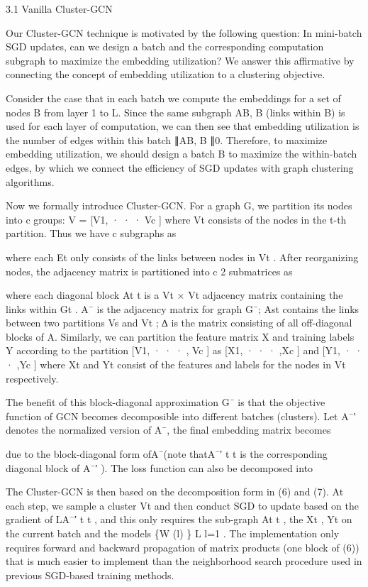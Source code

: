 \documentclass[
]{book}
\begin{document}
{{{3.1 Vanilla Cluster-GCN

Our Cluster-GCN technique is motivated by the following question: In mini-batch SGD updates, can we design a batch and the corresponding computation subgraph to maximize the embedding utilization? We answer this affirmative by connecting the concept of embedding utilization to a clustering objective.

Consider the case that in each batch we compute the embeddings for a set of nodes B from layer 1 to L. Since the same subgraph AB, B (links within B) is used for each layer of computation, we can then see that embedding utilization is the number of edges within this batch ∥AB, B ∥0. Therefore, to maximize embedding utilization, we should design a batch B to maximize the within-batch edges, by which we connect the efficiency of SGD updates with graph clustering algorithms.

Now we formally introduce Cluster-GCN. For a graph G, we partition its nodes into c groups: V = {[}V1, · · · Vc {]} where Vt consists of the nodes in the t-th partition. Thus we have c subgraphs as

where each Et only consists of the links between nodes in Vt . After reorganizing nodes, the adjacency matrix is partitioned into c 2 submatrices as

where each diagonal block At t is a \textbar Vt \textbar{} × \textbar Vt \textbar{} adjacency matrix containing the links within Gt . A¯ is the adjacency matrix for graph G¯; Ast contains the links between two partitions Vs and Vt ; ∆ is the matrix consisting of all off-diagonal blocks of A. Similarly, we can partition the feature matrix X and training labels Y according to the partition {[}V1, · · · , Vc {]} as {[}X1, · · · ,Xc {]} and {[}Y1, · · · ,Yc {]} where Xt and Yt consist of the features and labels for the nodes in Vt respectively.

The benefit of this block-diagonal approximation G¯ is that the objective function of GCN becomes decomposible into different batches (clusters). Let A¯′ denotes the normalized version of A¯, the final embedding matrix becomes

due to the block-diagonal form ofA¯(note thatA¯′ t t is the corresponding diagonal block of A¯′ ). The loss function can also be decomposed into

The Cluster-GCN is then based on the decomposition form in (6) and (7). At each step, we sample a cluster Vt and then conduct SGD to update based on the gradient of LA¯′ t t , and this only requires the sub-graph At t , the Xt , Yt on the current batch and the models \{W (l) \} L l=1 . The implementation only requires forward and backward propagation of matrix products (one block of (6)) that is much easier to implement than the neighborhood search procedure used in previous SGD-based training methods.

}}}
\end{document}
